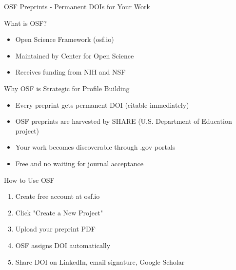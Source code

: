 \documentclass[11pt]{beamer}
\begin{document}
				\begin{frame}{OSF Preprints - Permanent DOIs for Your Work}
					\scriptsize
					\begin{block}{What is OSF?}
						\begin{itemize}
							\item Open Science Framework (osf.io)
							\item Maintained by Center for Open Science
							\item Receives funding from NIH and NSF
						\end{itemize}
					\end{block}
					\begin{block}{Why OSF is Strategic for Profile Building}
						\begin{itemize}
							\item Every preprint gets permanent DOI (citable immediately)
							\item OSF preprints are harvested by SHARE (U.S. Department of Education project)
							\item Your work becomes discoverable through .gov portals
							\item Free and no waiting for journal acceptance
						\end{itemize}
					\end{block}
					\begin{block}{How to Use OSF}
						\begin{enumerate}
							\item Create free account at osf.io
							\item Click "Create a New Project"
							\item Upload your preprint PDF
							\item OSF assigns DOI automatically
							\item Share DOI on LinkedIn, email signature, Google Scholar
						\end{enumerate}
					\end{block}
				\end{frame}
				
\end{document}
